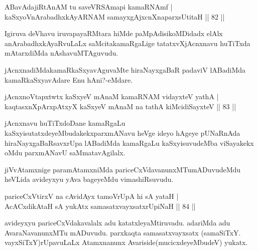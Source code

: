 \begin{shl}
ABavAdajiRtAnAM tu saveVRSAmapi kamaRNAmf |\\
kaSxyoV\s nArabadhxkAyARNAM samayxgAjxcnXnaparxsUtitaH \hfill || 82 ||
\end{shl}

\begin{artha}
Igiruva deVhavu iruvapayaRMtara hiMde paMpAdisikoMDidadx elAlx  anArabadhxkAyaRvuLaLx saMcitakamaRgaLige tatatxvXjAcnxnavu huTiTxda mAtarxdiMda nAshavuMTAguvudu.
\end{artha}

\begin{artha}
jAcnxnadiMdakamaRkaSxyavAguvaMte hiraNayxgaBaR padaviV lABadiMda kamaRkaSxya\-vAdare Enu hAni?-eMdare.
\end{artha}


\begin{shl}
jAcnxnoVtapxtwtx kaSxyeV mAnaM kamaRNAM vidayxteV yathA |\\
kaqtasxnXpArxpAtxyX kaSxyeV mAnaM na tathA kiMcidiSayxteV \hfill || 83 ||
\end{shl}

\begin{artha}
jAcnxnavu huTiTxdoDane kamaRgaLu kaSxyisutatxdeyeMbudakekx\break parxmANavu heVge ideyo hAgeye pUNaRnAda hiraNayxgaBaRsavxrUpa lABadiMda kamaRgaLu kaSxyisuvudeMba viSayakekx oMdu parxmANavU saMmatavAgilalx.
\end{artha}

\begin{artha}
jiVvAtamxnige paramAtamxniMda pariceCxVdavanunxMTumADuvudeMdu heVLida avideyxyu yAva bageyeMdu vimashiRsuvudu.
\end{artha}


\begin{shl}
pariceCxVtirxV na cAvidAyx tamoVrUpA hi sA yataH |\\
AcACxdikA\s taH sA yukAtx samasatxvayxsatxrUpiNaH \hfill || 84 ||
\end{shl}

\begin{artha}
avideyxyu pariceCxVdakavalalx adu katatxleyaMtiruvadu. adariMda adu AvaraNavanunxMTu mADuvudu. parxkaqta samasatxvayxsatx (samaSiTxY. vayxSiTxY)rUpavuLaLx Atamxnanunx Avariside(mucicxdeyeMbudeV) yukatx.
\end{artha}

